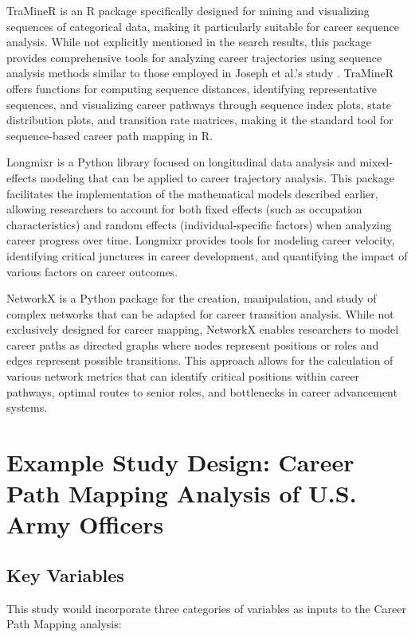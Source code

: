 \documentclass{article}
\begin{document}
TraMineR is an R package specifically designed for mining and visualizing sequences of categorical data, making it particularly suitable for career sequence analysis. While not explicitly mentioned in the search results, this package provides comprehensive tools for analyzing career trajectories using sequence analysis methods similar to those employed in Joseph et al.'s study \citep{joseph2012}. TraMineR offers functions for computing sequence distances, identifying representative sequences, and visualizing career pathways through sequence index plots, state distribution plots, and transition rate matrices, making it the standard tool for sequence-based career path mapping in R.

Longmixr is a Python library focused on longitudinal data analysis and mixed-effects modeling that can be applied to career trajectory analysis. This package facilitates the implementation of the mathematical models described earlier, allowing researchers to account for both fixed effects (such as occupation characteristics) and random effects (individual-specific factors) when analyzing career progress over time. Longmixr provides tools for modeling career velocity, identifying critical junctures in career development, and quantifying the impact of various factors on career outcomes.

NetworkX is a Python package for the creation, manipulation, and study of complex networks that can be adapted for career transition analysis. While not exclusively designed for career mapping, NetworkX enables researchers to model career paths as directed graphs where nodes represent positions or roles and edges represent possible transitions. This approach allows for the calculation of various network metrics that can identify critical positions within career pathways, optimal routes to senior roles, and bottlenecks in career advancement systems.

\section{Example Study Design: Career Path Mapping Analysis of U.S. Army Officers}

\subsection{Key Variables}
This study would incorporate three categories of variables as inputs to the Career Path Mapping analysis:
\end{document}

